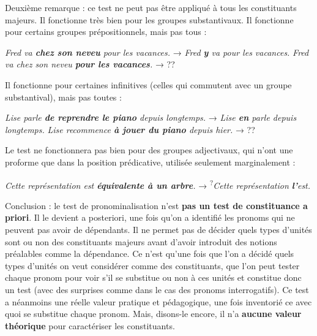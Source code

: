 {    Deuxième remarque : ce test ne peut pas être appliqué à tous les constituants majeurs. Il fonctionne très bien pour les groupes substantivaux. Il fonctionne pour certains groupes prépositionnels, mais pas tous :
    
    \ea
    \ea     \textit{{Fred va} \textbf{{chez son neveu}}  {pour les vacances.}}     \textrm{→}   \textit{{Fred} \textbf{{y}}  {va pour les vacances.}}
    \ex     \textit{{Fred va chez son neveu} \textbf{{pour les vacances}}.}     \textrm{→}  ??
    \z
    \z

    Il fonctionne pour certaines infinitives (celles qui commutent avec un groupe substantival), mais pas toutes :

    \ea
    \ea     \textit{{Lise parle} \textbf{{de reprendre le piano}}  {depuis longtemps.}}    \textrm{→}   \textit{{Lise} \textbf{{en}}  {parle depuis longtemps.}}
    \ex     \textit{{Lise recommence} \textbf{{à jouer du piano}}  {depuis hier.}}     \textrm{→}  ??
    \z
    \z

    Le test ne fonctionnera pas bien pour des groupes adjectivaux, qui n’ont une proforme que dans la position prédicative, utilisée seulement marginalement :

    \ea
    \textit{{Cette représentation est} \textbf{{équivalente à un arbre}}.}     \textrm{→}  \textsuperscript{?}\textit{{Cette représentation} \textbf{{l’}}{est.}}
    \z

    Conclusion : le test de pronominalisation n’est \textbf{pas un test de constituance a priori}. Il le devient a posteriori, une fois qu’on a identifié les pronoms qui ne peuvent pas avoir de dépendants. Il ne permet pas de décider quels types d’unités sont ou non des constituants majeurs avant d’avoir introduit des notions préalables comme la dépendance. Ce n’est qu’une fois que l’on a décidé quels types d’unités on veut considérer comme des constituants, que l’on peut tester chaque pronom pour voir s’il se substitue ou non à ces unités et constitue donc un test (avec des surprises comme dans le cas des pronoms interrogatifs). Ce test a néanmoins une réelle valeur pratique et pédagogique, une fois inventorié ce avec quoi se substitue chaque pronom. Mais, disons-le encore, il n’a \textbf{aucune valeur théorique} pour caractériser les constituants.

}

